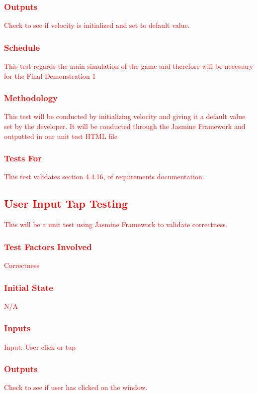 \documentclass[11pt, oneside]{article}   	%
\begin{document}
\subsubsection{\textcolor{red}{Outputs}}
\textcolor{red}{Check to see if velocity is initialized and set to default value.}
\subsubsection{\textcolor{red}{Schedule}}
\textcolor{red}{This test regards the main simulation of the game and therefore will be necessary for the Final Demonstration 1}
\subsubsection{\textcolor{red}{Methodology}}
\textcolor{red}{This test will be conducted by initializing velocity and giving it a default value set by the developer. It will be conducted through the Jasmine Framework and outputted in our unit test HTML file}
\subsubsection{\textcolor{red}{Tests For}}
\textcolor{red}{This test validates section 4.4.16, of requirements documentation.}


\subsection{\textcolor{red}{User Input Tap Testing}}
\textcolor{red}{This will be a unit test using Jasmine Framework to validate correctness.}
\subsubsection{\textcolor{red}{Test Factors Involved}}
\textcolor{red}{Correctness}
\subsubsection{\textcolor{red}{Initial State}}
\textcolor{red}{N/A}
\subsubsection{\textcolor{red}{Inputs}}
\textcolor{red}{Input: User click or tap}
\subsubsection{\textcolor{red}{Outputs}}
\textcolor{red}{Check to see if user has clicked on the window.}
\end{document}

